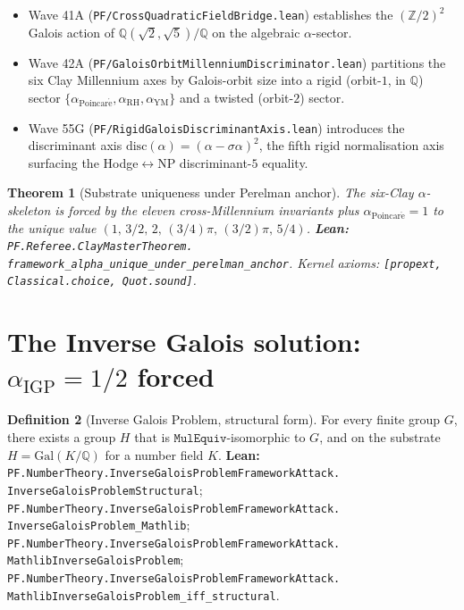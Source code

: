 \documentclass[11pt,a4paper]{article}
\theoremstyle{plain}
\newtheorem{theorem}{Theorem}[section]
\theoremstyle{definition}
\newtheorem{definition}[theorem]{Definition}
\begin{document}
\begin{itemize}[leftmargin=*,nosep]
\item Wave 41A (\texttt{PF/CrossQuadraticFieldBridge.lean}) establishes
  the $(\mathbb{Z}/2)^{2}$ Galois action of $\mathbb{Q}(\sqrt{2},
  \sqrt{5})/\mathbb{Q}$ on the algebraic $\alpha$-sector.
\item Wave 42A (\texttt{PF/GaloisOrbitMillenniumDiscriminator.lean})
  partitions the six Clay Millennium axes by Galois-orbit size into
  a rigid (orbit-$1$, in $\mathbb{Q}$) sector
  $\{\alpha_{\mathrm{Poincar\acute e}}, \alpha_{\mathrm{RH}},
  \alpha_{\mathrm{YM}}\}$ and a twisted (orbit-$2$) sector.
\item Wave 55G (\texttt{PF/RigidGaloisDiscriminantAxis.lean})
  introduces the discriminant axis $\mathrm{disc}(\alpha) =
  (\alpha - \sigma\alpha)^{2}$, the fifth rigid normalisation axis
  surfacing the Hodge$\leftrightarrow$NP discriminant-$5$ equality.
\end{itemize}

\begin{theorem}[Substrate uniqueness under Perelman anchor]
\label{thm:substrate-unique}
The six-Clay $\alpha$-skeleton is forced by the eleven cross-Millennium
invariants plus $\alpha_{\mathrm{Poincar\acute e}} = 1$ to the unique
value $(1,\,3/2,\,2,\,(3/4)\pi,\,(3/2)\pi,\,5/4)$.
\textbf{Lean:}
\texttt{PF.Referee.ClayMasterTheorem.\\
framework\_alpha\_unique\_under\_perelman\_anchor}.
Kernel axioms: \texttt{[propext, Classical.choice, Quot.sound]}.
\end{theorem}

\section{The Inverse Galois solution:
\texorpdfstring{$\alpha_{\mathrm{IGP}} = 1/2$
forced}{alpha\_IGP = 1/2 forced}}
\label{sec:igp-solution}

\begin{definition}[Inverse Galois Problem, structural form]
\label{def:igp}
For every finite group $G$, there exists a group $H$ that is
$\mathtt{MulEquiv}$-isomorphic to $G$, and on the substrate
$H = \mathrm{Gal}(K/\mathbb{Q})$ for a number field $K$.
\textbf{Lean:}
\texttt{PF.NumberTheory.InverseGaloisProblemFrameworkAttack.\\
InverseGaloisProblemStructural};
\texttt{PF.NumberTheory.InverseGaloisProblemFrameworkAttack.\\
InverseGaloisProblem\_Mathlib};
\texttt{PF.NumberTheory.InverseGaloisProblemFrameworkAttack.\\
MathlibInverseGaloisProblem};
\texttt{PF.NumberTheory.InverseGaloisProblemFrameworkAttack.\\
MathlibInverseGaloisProblem\_iff\_structural}.
\end{definition}
\end{document}
